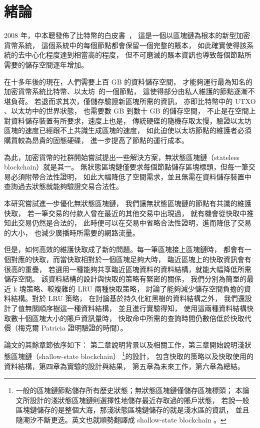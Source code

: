 \chapter{緒論}
\label{c:intro}

2008 年，中本聰發佈了比特幣的白皮書~\cite{nakamoto2019bitcoin}，
這是一個以區塊鏈為根本的新型加密貨幣系統，
這個系統中的每個節點都會保留一個完整的賬本，
如此確實使得該系統的去中心化程度達到相當高的程度，
但不可磨滅的賬本資訊也導致每個節點所需要的儲存空間逐年增加。

在十多年後的現在，人們需要上百 GB 的資料儲存空間，
才能夠運行最為知名的加密貨幣系統比特幣、以太坊~\cite{wood2014ethereum}的一個節點，
這使得部分由私人維護的節點逐漸不堪負荷。
若退而求其次，僅儲存驗證新區塊所需的資訊，
亦即比特幣中的 UTXO 、以太坊中的世界狀態，
也需要數 GB 到數十 GB 的儲存空間，
不止是在空間上對資料儲存裝置有所要求，速度上也是，
傳統硬碟的隨機存取太慢，驗證以太坊區塊的速度已經跟不上共識生成區塊的速度，
如此迫使以太坊節點的維護者必須購買較為昂貴的固態硬碟，
進一步提高了節點的運行成本。

為此，加密貨幣的社群開始嘗試提出一些解決方案，無狀態區塊鏈（stateless blockchain）就是其一。
無狀態區塊鏈僅要求每個節點儲存區塊標頭，但每一筆交易必須附帶合法性證明，
如此大幅降低了空間需求，並且無需在資料儲存裝置中查詢過去狀態就能夠驗證交易合法性。

本研究嘗試進一步優化無狀態區塊鏈，
我們讓無狀態區塊鏈的節點有共識的維護快取，
若一筆交易的付款人曾在最近的其他交易中出現過，
就有機會從快取中推知此交易仍然是合法的，
此時便可以在交易中省略合法性證明，進而降低了交易的大小，
也減少廣播時所需要的網路流量。

但是，如何高效的維護快取成了新的問題。每一筆區塊接上區塊鏈時，
都會有一個對應的快取，而當快取相對於一個區塊足夠大時，
臨近區塊上的快取資訊會有很高的重疊，
若選用一種能夠共享臨近區塊資料的資料結構，就能大幅降低所需儲存空間。
該資料結構的設計與快取的策略有緊密的關係，
我們分別為簡單的最近 k 塊策略、較複雜的 LRU 兩種快取策略，
討論了能夠減少儲存空間負擔的資料結構。對於 LRU 策略，
在討論基於持久化紅黑樹的資料結構之外，
我們還設計了值無關順序樹這一種資料結構，
並且進行實驗得知，
使用這兩種資料結構快取數十個區塊大小的賬戶資訊量時，
快取命中所需的查詢時間仍數倍低於快取代價（梅克爾 Patricia 證明驗證的時間）。

論文的其餘章節依序如下：
第二章說明背景以及相關工作，第三章開始說明淺狀態區塊鏈（shallow-state blockchain）
\footnote{一般的區塊鏈節點儲存所有歷史狀態；無狀態區塊鏈僅儲存區塊標頭；
本論文所設計的淺狀態區塊鏈則選擇性地儲存最近存取過的賬戶狀態，
若說一般區塊鏈儲存的是整個大海，那淺狀態區塊鏈儲存的就是淺水區的資訊，
並且隨潮汐不斷更迭。英文也就順勢翻譯成 shallow-state blockchain 。}的設計，
包含快取的策略以及快取使用的資料結構，第四章為實驗的設計與結果，
第五章為未來工作，第六章為總結。